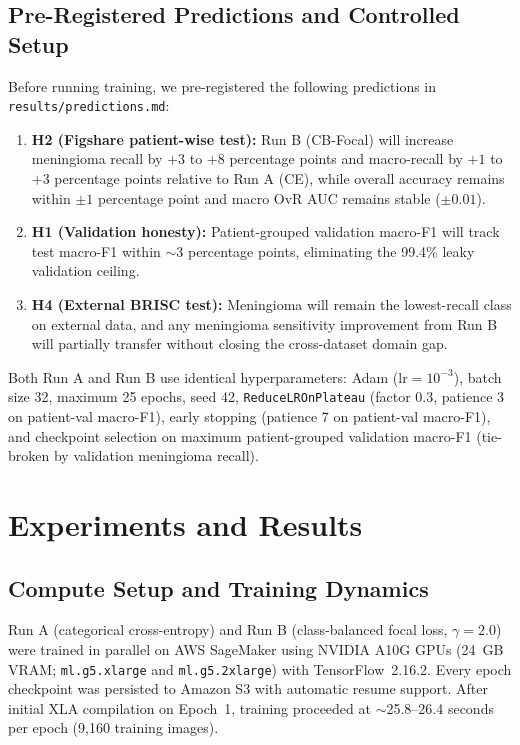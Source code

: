 \documentclass[conference]{IEEEtran}
\begin{document}
\subsection{Pre-Registered Predictions and Controlled Setup}
Before running training, we pre-registered the following predictions in \texttt{results/predictions.md}:
\begin{enumerate}
    \item \textbf{H2 (Figshare patient-wise test):} Run B (CB-Focal) will increase meningioma recall by $+3$ to $+8$ percentage points and macro-recall by $+1$ to $+3$ percentage points relative to Run A (CE), while overall accuracy remains within $\pm 1$ percentage point and macro OvR AUC remains stable ($\pm 0.01$).
    \item \textbf{H1 (Validation honesty):} Patient-grouped validation macro-F1 will track test macro-F1 within $\sim$3 percentage points, eliminating the 99.4\% leaky validation ceiling.
    \item \textbf{H4 (External BRISC test):} Meningioma will remain the lowest-recall class on external data, and any meningioma sensitivity improvement from Run B will partially transfer without closing the cross-dataset domain gap.
\end{enumerate}

Both Run A and Run B use identical hyperparameters: Adam ($\text{lr}=10^{-3}$), batch size 32, maximum 25 epochs, seed 42, \texttt{ReduceLROnPlateau} (factor 0.3, patience 3 on patient-val macro-F1), early stopping (patience 7 on patient-val macro-F1), and checkpoint selection on maximum patient-grouped validation macro-F1 (tie-broken by validation meningioma recall).

\section{Experiments and Results}

\subsection{Compute Setup and Training Dynamics}
Run A (categorical cross-entropy) and Run B (class-balanced focal loss, $\gamma=2.0$) were trained in parallel on AWS SageMaker using NVIDIA A10G GPUs (24~GB VRAM; \texttt{ml.g5.xlarge} and \texttt{ml.g5.2xlarge}) with TensorFlow~2.16.2. Every epoch checkpoint was persisted to Amazon S3 with automatic resume support. After initial XLA compilation on Epoch~1, training proceeded at $\sim$25.8--26.4 seconds per epoch (9,160 training images).
\end{document}
